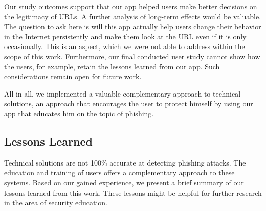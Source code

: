 Our study outcomes support that our app helped users make better decisions on the legitimacy of URLs.
A further analysis of long-term effects would be valuable. The question to ask here is will this app actually help users change their behavior in the Internet persistently and make them look at the URL even if it is only occasionally. This is an aspect, which we were not able to address within the scope of this work. 
Furthermore, our final conducted user study cannot show how the users, for example, retain the lessons learned from our app. Such considerations remain open for future work.

All in all, we implemented a valuable complementary approach to technical solutions, an approach that encourages the user to protect himself by using our app that educates him on the topic of phishing.

\subsection{Lessons Learned}
Technical solutions are not 100\% accurate at detecting phishing attacks.
The education and training of users offers a complementary approach to these systems.
Based on our gained experience, we present a brief summary of our lessons learned from this work.
These lessons might be helpful for further research in the area of security education.

